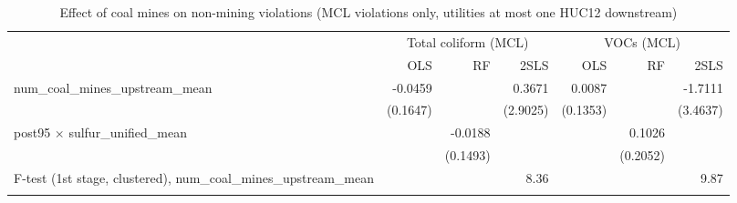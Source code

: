 
\begin{table}[htbp]
   
   \caption{\label{2sls_dwnstrm_nonminevio_mcl} Effect of coal mines on non-mining violations (MCL violations only, utilities at most one HUC12 downstream)}
   \bigskip
   
   \centering
   
   \begin{adjustbox}{width = \textwidth, center}
      
      
      \begin{tabular}{lrrrrrr}
         \toprule
         
          & \multicolumn{3}{c}{Total coliform (MCL)} & \multicolumn{3}{c}{VOCs (MCL)}\\
         
                                                                             & OLS                   & RF                    & 2SLS                  & OLS                   & RF                    & 2SLS\\  
         
         \midrule 
         num\_coal\_mines\_upstream\_mean                                    & -0.0459               &                       & 0.3671                & 0.0087                &                       & -1.7111\\   
                                                                             & (0.1647)              &                       & (2.9025)              & (0.1353)              &                       & (3.4637)\\   
         post95 $\times$ sulfur\_unified\_mean                               &                       & -0.0188               &                       &                       & 0.1026                &   \\   
                                                                             &                       & (0.1493)              &                       &                       & (0.2052)              &   \\   
         
         F-test (1st stage, clustered), num\_coal\_mines\_upstream\_mean     &                       &                       & 8.36                  &                       &                       & 9.87\\  
         
          \\
         

\end{tabular}
\end{adjustbox}
\end{table}
